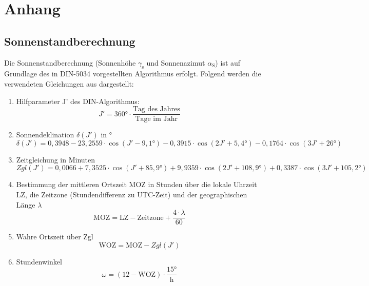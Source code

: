 \chapter{Anhang}
\thispagestyle{empty}
\section*{Sonnenstandberechnung}\label{Anhang: Sonnenstand}
Die Sonnenstandberechnung (Sonnenhöhe $\gamma_\text{s}$ und Sonnenazimut $\alpha_\text{S}$) ist auf Grundlage des in DIN-5034 \cite{DIN5034} vorgestellten Algorithmus erfolgt. Folgend werden die verwendeten Gleichungen aus \citet{Quaschning2015} dargestellt:

\begin{enumerate}
\item Hilfparameter J' des DIN-Algorithmus:\\
	\begin{equation*}
		J' = 360\text{°} \cdot \dfrac{\text{Tag des Jahres}}{\text{Tage im Jahr}}
	\end{equation*}
\item Sonnendeklination $\delta(J')$ in °
	\begin{equation*}
		\delta(J') = 0,3948 - 23,2559 \cdot \cos(J' - 9,1\text{°}) - 0,3915 \cdot \cos(2J' + 5,4\text{°}) - 0,1764 \cdot \cos(3J'+ 26\text{°})
	\end{equation*}
\item  Zeitgleichung in Minuten
	\begin{equation*}
		Zgl(J') = 0,0066 + 7,3525 \cdot \cos(J' + 85,9\text{°}) + 9,9359 \cdot \cos(2J' + 108,9\text{°}) + 0,3387 \cdot \cos(3J' + 105,2\text{°})
	\end{equation*}
\item Bestimmung der mittleren Ortszeit MOZ in Stunden über die lokale Uhrzeit LZ, die Zeitzone (Stundendifferenz zu UTC-Zeit) und der geographischen Länge $\lambda$
	\begin{equation*}
		\text{MOZ} = \text{LZ} - \text{Zeitzone} + \dfrac{4 \cdot \lambda}{60} 
	\end{equation*}
\item Wahre Ortszeit über Zgl
	\begin{equation*}
		\text{WOZ} = \text{MOZ} - Zgl(J')
	\end{equation*}
\item Stundenwinkel
	\begin{equation*}
		\omega = (12 - \text{WOZ}) \cdot \dfrac{15\text{°}}{\text{h}}
	\end{equation*}

\end{enumerate}
